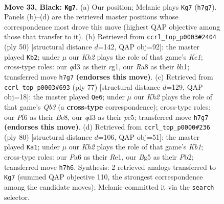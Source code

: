 \documentclass[11pt]{article}
\begin{document}
\clearpage

\begin{figure}[p]\centering
\begin{subfigure}{0.46\textwidth}\centering
\resizebox{\linewidth}{!}{%
\newchessgame
\chessboard[
  setfen={rnR5/3n3k/p2p1p2/3PP1b1/6P1/q1NQ4/4N3/4K3 b - - 0 33},
  showmover=false,
  pgfstyle=straightmove, color=movearrow, markmove={h7-g7}
]}
\caption{}
\end{subfigure}\hfill
\begin{subfigure}{0.46\textwidth}\centering
\resizebox{\linewidth}{!}{%
\newchessgame
\chessboard[
  setfen={r3k3/3q4/1p2pB2/1N1n3P/P2R1P2/1P6/2P1Q3/2K3rb w q - 1 26},
  showmover=false,
  pgfstyle=straightmove, color=movearrow, markmove={c1-b2}
]}
\caption{}
\end{subfigure}
\\[4pt]
\begin{subfigure}{0.46\textwidth}\centering
\resizebox{\linewidth}{!}{%
\newchessgame
\chessboard[
  setfen={4b1k1/4rNp1/pq3n1p/2P1NQ2/8/7P/6PK/4R3 b - - 0 39},
  showmover=false,
  pgfstyle=straightmove, color=movearrow, markmove={b6-e6}
]}
\caption{}
\end{subfigure}\hfill
\begin{subfigure}{0.46\textwidth}\centering
\resizebox{\linewidth}{!}{%
\newchessgame
\chessboard[
  setfen={2kn4/1p2bp1Q/7P/p1P4r/4N3/2Bq4/1P6/1K2R3 w - - 1 41},
  showmover=false,
  pgfstyle=straightmove, color=movearrow, markmove={b1-a1}
]}
\caption{}
\end{subfigure}
\caption{\textbf{Move 33, Black: \texttt{Kg7}.} (a) Our position; Melanie plays \texttt{Kg7} (\texttt{h7g7}). Panels (b)--(d) are the retrieved master positions whose correspondence most drove this move (highest QAP objective among those that transfer to it). (b) Retrieved from \texttt{ccrl\_top\_p0003\#2404} (ply 50) [structural distance $d$=142, QAP obj=92]: the master played \texttt{Kb2}; under $\mu$ our \emph{Kh2} plays the role of that game's \emph{Kc1}; cross-type roles: our \emph{q}d3 as their \emph{r}g1, our \emph{R}a8 as their \emph{b}h1; transferred move \texttt{h7g7} \textbf{(endorses this move)}. (c) Retrieved from \texttt{ccrl\_top\_p0003\#693} (ply 77) [structural distance $d$=129, QAP obj=18]: the master played \texttt{Qe6}; under $\mu$ our \emph{Kh2} plays the role of that game's \emph{Qb3} (a \textbf{cross-type} correspondence); cross-type roles: our \emph{P}f6 as their \emph{B}e8, our \emph{q}d3 as their \emph{p}c5; transferred move \texttt{h7g7} \textbf{(endorses this move)}. (d) Retrieved from \texttt{ccrl\_top\_p0000\#236} (ply 80) [structural distance $d$=106, QAP obj=51]: the master played \texttt{Ka1}; under $\mu$ our \emph{Kh2} plays the role of that game's \emph{Kb1}; cross-type roles: our \emph{P}a6 as their \emph{R}e1, our \emph{B}g5 as their \emph{P}b2; transferred move \texttt{h7h6}. Synthesis: 2 retrieved analogs transferred to \texttt{Kg7} (summed QAP objective 110, the strongest correspondence among the candidate moves); Melanie committed it via the \texttt{search} selector.}
\label{fig:thought-m65}
\end{figure}
\end{document}
